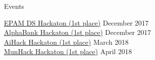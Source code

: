 \documentclass{resume} %
\begin{document}
\vspace{-1.8\baselineskip}
\begin{rSection}{Events}
\vspace{-0.7\baselineskip}

\begin{footnotesize}
\begin{multicols}{2}
\href{https://events.epam.com/events/data-science-hackathon}{EPAM DS Hackaton (1st place)} \hfill December 2017 \\
\href{http://1.changellenge.com/nightpython}{AlphaBank Hackaton (1st place)} \hfill December 2017 \\
\href{http://aihack.ai-hub.ru/}{AiHack Hackaton (1st place)} \hfill March 2018 \\
\href{http://munhack.ru/}{MunHack Hackaton (1st place)} \hfill April 2018
\end{multicols}
\end{footnotesize}

\end{rSection} 


\end{document}
